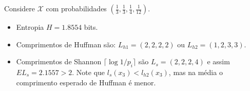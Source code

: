 \begin{frame}[allowframebreaks]
  \framebreak
  \begin{example}
  Considere $\mathcal{X}$ com probabilidades $(\frac{1}{3}, \frac{1}{3}, \frac{1}{4}, \frac{1}{12})$.
  \begin{itemize}
  \item Entropia $H=1.8554$ bits.
  \item Comprimentos de Huffman são: $L_{h1} = (2,2,2,2)$ ou $L_{h2} = (1,2,3,3)$.
  \item Comprimentos de Shannon $\lceil \log 1/p_i \rceil$ são $L_s = (2,2,2,4)$ e assim $E L_s = 2.1557 > 2$. 
	Note que $l_s(x_3) < l_{h2} (x_3)$, mas na média o comprimento esperado de Huffman é menor.
  \end{itemize}
  \end{example} 

\end{frame}



